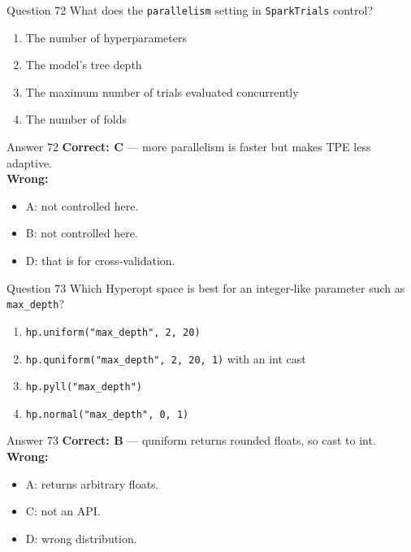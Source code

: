 \documentclass[aspectratio=169,11pt]{beamer}
\begin{document}
	\begin{frame}{Question 72}
		What does the \texttt{parallelism} setting in \texttt{SparkTrials} control?
		\begin{enumerate}[label=\Alph*.]
			\item The number of hyperparameters
			\item The model's tree depth
			\item The maximum number of trials evaluated concurrently
			\item The number of folds
		\end{enumerate}
	\end{frame}
	\begin{frame}{Answer 72}
		\textbf{Correct: C} --- more parallelism is faster but makes TPE less adaptive.\\
		\vspace{0.5em}
		\textbf{Wrong:}
		\begin{itemize}
			\item A: not controlled here.
			\item B: not controlled here.
			\item D: that is for cross-validation.
		\end{itemize}
	\end{frame}
	
	\begin{frame}{Question 73}
		Which Hyperopt space is best for an integer-like parameter such as \texttt{max\_depth}?
		\begin{enumerate}[label=\Alph*.]
			\item \texttt{hp.uniform("max\_depth", 2, 20)}
			\item \texttt{hp.quniform("max\_depth", 2, 20, 1)} with an int cast
			\item \texttt{hp.pyll("max\_depth")}
			\item \texttt{hp.normal("max\_depth", 0, 1)}
		\end{enumerate}
	\end{frame}
	\begin{frame}{Answer 73}
		\textbf{Correct: B} --- quniform returns rounded floats, so cast to int.\\
		\vspace{0.5em}
		\textbf{Wrong:}
		\begin{itemize}
			\item A: returns arbitrary floats.
			\item C: not an API.
			\item D: wrong distribution.
		\end{itemize}
	\end{frame}
	
\end{document}
